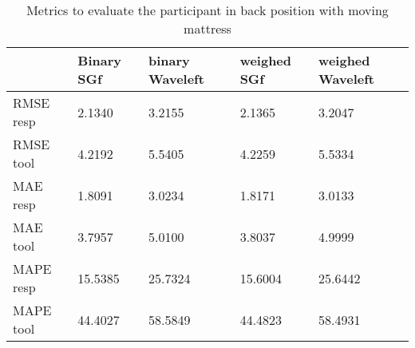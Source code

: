 \begin{table}[]

    \centering

\begin{tabular}{|lllll|}
\hline 
& Binary SGf & binary Waveleft & weighed  SGf & weighed Waveleft \\ 
 
\hline 
RMSE resp &  2.1340  &  3.2155  &  2.1365  &  3.2047 \\ 
RMSE tool &     4.2192  &  5.5405  &  4.2259   & 5.5334 \\  
MAE resp & 1.8091 &   3.0234 &     1.8171 &  3.0133 \\ 
MAE tool &     3.7957 & 5.0100 & 3.8037 &  4.9999 \\  
MAPE resp & 15.5385 & 25.7324 & 15.6004 & 25.6442 \\ 
MAPE tool & 44.4027 & 58.5849 & 44.4823 & 58.4931 \\ 

\hline 
\end{tabular}

\caption{Metrics to evaluate the participant in back position with moving mattress}
\end{table}

